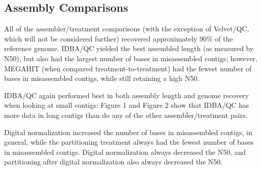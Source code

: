 


\subsection*{Assembly Comparisons}

All of the assembler/treatment comparisons (with the exception of
Velvet/QC, which will not be considered further) recovered
approximately 90\% of the reference genome.  IDBA/QC yielded the best
assembled length (as measured by N50), but also had the largest number
of bases in misassembled contigs; however, MEGAHIT (when compared
treatment-to-treatment) had the fewest number of bases in misassembled
contigs, while still retaining a high N50.

IDBA/QC again performed best in both assembly length and genome
recovery when looking at small contigs: Figure 1 and Figure 2 show
that IDBA/QC has more data in long contigs than do any of the other
assembler/treatment pairs.

Digital normalization increased the number of bases in misassembled
contigs, in general, while the partitioning treatment always had the
fewest number of bases in misassembled contigs.  Digital normalization
always decreased the N50, and partitioning after digital normalization
also always decreased the N50.

